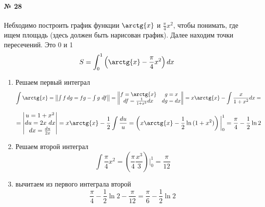 \documentclass{article}
\begin{document}
\textbf{№ 28} 
\\
\\
Небходимо построить график функции $\arctg{x}$ и $\frac{\pi}{4}x^2$, чтобы понимать, где ищем площадь (здесь должен быть нарисован график). Далее находим точки пересечений. Это 0 и 1
$$ S = \int_{0}^{1} \left( \arctg{x}-\frac{\pi}{4}x^2 \right) dx $$

\begin{enumerate}
\item Решаем первый интеграл
$$ \int \arctg{x}
= \begin{Vmatrix} \int f \,dg = fg - \int g \ df \end{Vmatrix} 
= \begin{Vmatrix} f = \arctg{x} &  g = x \\
                 df = \frac{1}{1+x^2}dx  & dg = dx \end{Vmatrix} 
= x\arctg{x} - \int \frac{x}{1+x^2} dx 
= $$

$$ = \begin{vmatrix} u = 1+x^2 \\
                    du = 2x \ dx \\
                    dx = \frac{du}{2x} \end{vmatrix} 
= x\arctg{x} - \frac{1}{2} \int \frac{du}{u}
= \left( x\arctg{x} - \frac{1}{2} \ln{(1+x^2)} \right) \bigg\vert_{0}^{1}
= \frac{\pi}{4} - \frac{1}{2} \ln{2} $$

\item Решаем второй интеграл
$$ \int \frac{\pi}{4}x^2 
= \left( \frac{\pi}{4} \frac{x^3}{3} \right) \bigg\vert_{0}^{1} 
= \frac{\pi}{12} $$

\item вычитаем из первого интеграла второй
$$ \frac{\pi}{4} - \frac{1}{2} \ln{2} - \frac{\pi}{12}
= \frac{\pi}{6} - \frac{1}{2} \ln{2} $$

\end{enumerate}
\end{document}
